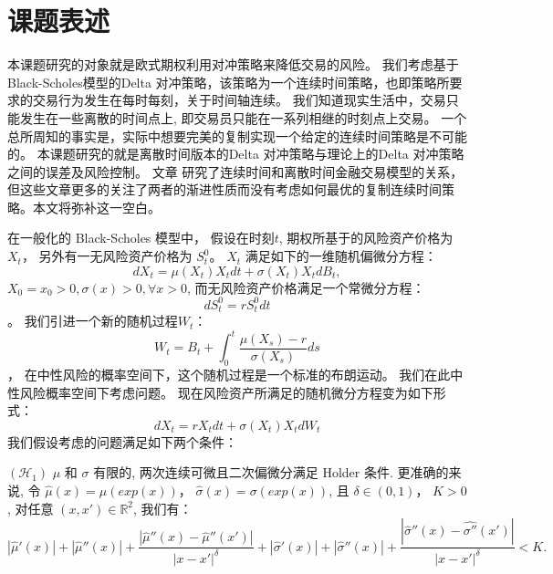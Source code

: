 
\section{课题表述} %
\label{sec:subject}

本课题研究的对象就是欧式期权利用对冲策略来降低交易的风险。
我们考虑基于Black-Scholes模型的Delta 对冲策略，该策略为一个连续时间策略，也即策略所要求的交易行为发生在每时每刻，关于时间轴连续。
我们知道现实生活中，交易只能发生在一些离散的时间点上, 即交易员只能在一系列相继的时刻点上交易。
一个总所周知的事实是，实际中想要完美的复制实现一个给定的连续时间策略是不可能的。
本课题研究的就是离散时间版本的Delta 对冲策略与理论上的Delta 对冲策略之间的误差及风险控制。
文章\cite{WhenIsTimeContinuous,DiscreteTimeHedgingErrors,Hayashi05evaluatinghedging} 研究了连续时间和离散时间金融交易模型的关系，
但这些文章更多的关注了两者的渐进性质而没有考虑如何最优的复制连续时间策略。本文将弥补这一空白。

在一般化的 Black-Scholes 模型中， 假设在时刻$t$, 期权所基于的风险资产价格为 $X_t$， 另外有一无风险资产价格为 $S_t^0$。
$X_t$ 满足如下的一维随机偏微分方程：
\begin{equation}
dX_t=\mu(X_t)X_tdt+\sigma(X_t)X_tdB_t,
\end{equation}
$X_0=x_0>0, \sigma(x)>0, \forall x>0$,
而无风险资产价格满足一个常微分方程：
\begin{equation}
dS_t^0=rS^0_tdt
\end{equation}。
我们引进一个新的随机过程$W_t$：
\begin{equation}
W_t=B_t+\int^t_0\frac{\mu(X_s)-r}{\sigma(X_s)}ds
\end{equation}，
在中性风险的概率空间下，这个随机过程是一个标准的布朗运动。 我们在此中性风险概率空间下考虑问题。
现在风险资产所满足的随机微分方程变为如下形式：
\begin{equation}
dX_t=rX_tdt+\sigma(X_t)X_tdW_t
\end{equation}
我们假设考虑的问题满足如下两个条件：

$(\mathcal{H}_1)$ $\mu$ 和 $\sigma$ 有限的, 两次连续可微且二次偏微分满足 Holder 条件. 更准确的来说, 令 $\hat{\mu}(x)=\mu(exp(x))$， $\hat{\sigma}(x)=\sigma(exp(x))$, 且 $\delta\in (0,1)$， $K>0$, 对任意 $(x,x')\in \mathbb{R}^2$, 我们有：
\begin{equation}
|\hat{\mu}'(x)|+|\hat{\mu}''(x)|+\frac{|\hat{\mu}''(x)-\hat{\mu}''(x')|}{|x-x'|^\delta}+|\hat{\sigma}'(x)|+|\hat{\sigma}''(x)|+\frac{|\hat{\sigma}''(x)-\hat{\sigma''}(x')|}{|x-x'|^\delta}<K.
\end{equation}

